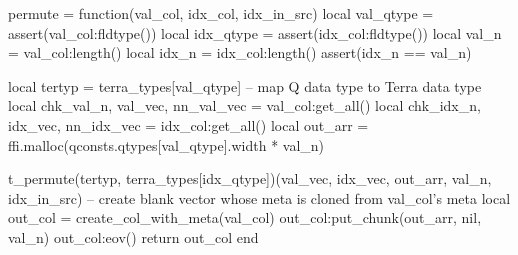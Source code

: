 permute = function(val_col, idx_col, idx_in_src)
  local val_qtype = assert(val_col:fldtype())
  local idx_qtype = assert(idx_col:fldtype())
  local val_n = val_col:length()
  local idx_n = idx_col:length()
  assert(idx_n == val_n)

  local tertyp = terra_types[val_qtype]  -- map Q data type to Terra data type
  local chk_val_n, val_vec, nn_val_vec = val_col:get_all()
  local chk_idx_n, idx_vec, nn_idx_vec = idx_col:get_all()
  local out_arr = ffi.malloc(qconsts.qtypes[val_qtype].width * val_n)

  t_permute(tertyp, terra_types[idx_qtype])(val_vec, idx_vec, out_arr, val_n, idx_in_src)
  -- create blank vector whose meta is cloned from val_col's meta
  local out_col = create_col_with_meta(val_col)  
  out_col:put_chunk(out_arr, nil, val_n) 
  out_col:eov()
  return out_col
end

